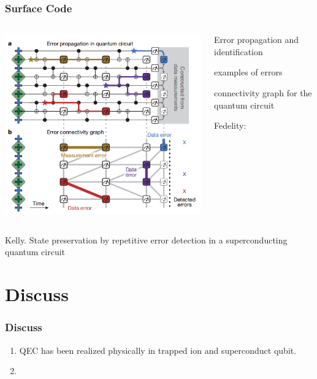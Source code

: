 \documentclass[aspectratio=169,10pt]{beamer}
\begin{document}
\begin{frame}
    \frametitle{Surface Code}
    \begin{columns}
        \begin{column}{0.5\textwidth}
            \centering
            \includegraphics[width=\columnwidth]{figure/surface3.png}
        \end{column}
        \begin{column}{0.5\textwidth}
            \centering
            \begin{block}{Error propagation and identification}
                \begin{description}
                    \item examples of errors 
                    \item connectivity graph for the quantum circuit
                \end{description}
            \end{block}
            Fedelity: 
        \end{column}
    \end{columns}
\tiny{Kelly. State preservation by repetitive error detection in a superconducting quantum circuit}
\end{frame}


\section{Discuss}
\begin{frame}
    \frametitle{Discuss}
    \begin{enumerate}
        \item QEC has been realized physically in trapped ion and superconduct qubit.
        \item 
    \end{enumerate}
\end{frame}

\begin{frame}
\end{frame}
\end{document}
